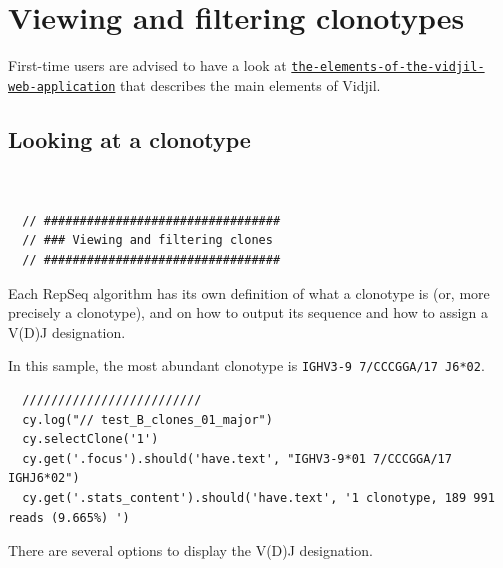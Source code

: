 \section{Viewing and filtering clonotypes}
\label{sec:viewing-clonotypes}

First-time users are advised to have a look at \href{https://www.vidjil.org/doc/user/#the-elements-of-the-vidjil-web-application}{\tt the-elements-of-the-vidjil-web-application} that describes the main elements of Vidjil.

\subsection{Looking at a clonotype}
\begin{verbatim}


  // #################################
  // ### Viewing and filtering clones
  // #################################

\end{verbatim}


Each RepSeq algorithm has its own definition of what a clonotype is (or, more precisely
a clonotype), and on how to output its sequence and how to assign a V(D)J designation.

In this sample, the most abundant clonotype
is \texttt{IGHV3-9 7/CCCGGA/17 J6*02}.



\begin{verbatim}
  /////////////////////////
  cy.log("// test_B_clones_01_major")
  cy.selectClone('1')
  cy.get('.focus').should('have.text', "IGHV3-9*01 7/CCCGGA/17 IGHJ6*02")
  cy.get('.stats_content').should('have.text', '1 clonotype, 189 991 reads (9.665%) ')

\end{verbatim}


There are several options to display the V(D)J designation.


